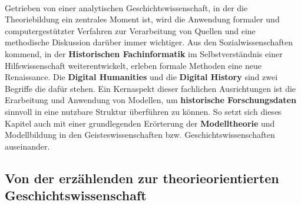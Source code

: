 \documentclass[12pt,a4paper]{article}
\begin{document}
\\
Getrieben von einer analytischen Geschichtswissenschaft, in der die Theoriebildung ein zentrales Moment ist, wird die Anwendung formaler und computergestützter Verfahren zur Verarbeitung von Quellen und eine methodische Diskussion darüber immer wichtiger. Aus den Sozialwissenschaften kommend, in der \textbf{Historischen Fachinformatik} im Selbstverständnis einer Hilfswissenschaft weiterentwickelt, erleben formale Methoden eine neue Renaissance. Die \textbf{Digital Humanities} und die \textbf{Digital History} sind zwei Begriffe die dafür stehen. Ein Kernaspekt dieser fachlichen Ausrichtungen ist die Erarbeitung und Anwendung von Modellen, um \textbf{historische Forschungsdaten} sinnvoll in eine nutzbare  Struktur überführen zu können. So setzt sich dieses Kapitel auch mit einer grundlegenden Erörterung der \textbf{Modelltheorie} und Modellbildung in den Geisteswissenschaften bzw. Geschichtswissenschaften auseinander.

\subsection{Von der erzählenden zur theorieorientierten Geschichtswissenschaft}
\end{document}
